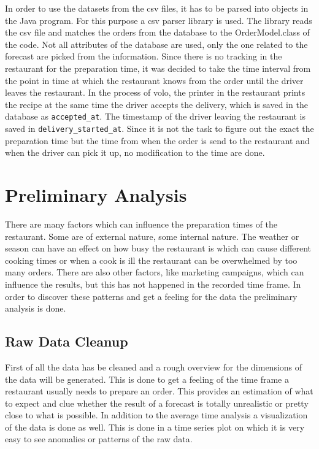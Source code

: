 In order to use the datasets from the csv files, it has to be parsed into objects in the Java program. For this purpose a csv parser library is used. The library reads the csv file and matches the orders from the database to the OrderModel.class of the code. Not all attributes of the database are used, only the one related to the forecast are picked from the information. Since there is no tracking in the restaurant for the preparation time, it was decided to take the time interval from the point in time at which the restaurant knows from the order until the driver leaves the restaurant. In the process of volo, the printer in the restaurant prints the recipe at the same time the driver accepts the delivery, which is saved in the database as \texttt{accepted\_at}. The timestamp of the driver leaving the restaurant is saved in \texttt{delivery\_started\_at}. Since it is not the task to figure out the exact the preparation time but the time from when the order is send to the restaurant and when the driver can pick it up, no modification to the time are done.
\section{Preliminary Analysis}\label{section:Preliminary Analysis}
There are many factors which can influence the preparation times of the restaurant. Some are of external nature, some internal nature. The weather or season can have an effect on how busy the restaurant is which can cause different cooking times or when a cook is ill the restaurant can be overwhelmed by too many orders.\newline
There are also other factors, like marketing campaigns, which can influence the results, but this has not happened in the recorded time frame.\newline
In order to discover these patterns and get a feeling for the data the preliminary analysis is done.
\subsection{Raw Data Cleanup}\label{subsection:Raw Data Cleanup}
First of all the data has be cleaned and a rough overview for the dimensions of the data will be generated. This is done to get a feeling of the time frame a restaurant usually needs to prepare an order. This provides an estimation of what to expect and clue whether the result of a forecast is totally unrealistic or pretty close to what is possible. In addition to the average time analysis a visualization of the data is done as well. This is done in a time series plot on which it is very easy to see anomalies or patterns of the raw data.\newline

